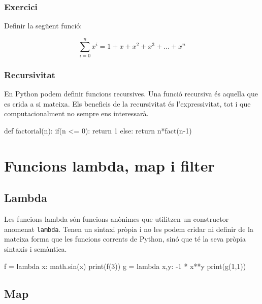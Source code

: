 \subsubsection*{Exercici } 


Definir la següent funció:

\[
\sum_{i=0}^{n}x^{i}=1+x+x^{2}+x^{3}+\ldots + x^{n}
\]



\subsubsection{Recursivitat}

En Python podem definir funcions recursives. Una funció recursiva és aquella que es crida a si mateixa. Els beneficis de la recursivitat és l'expressivitat, tot i que computacionalment no sempre ens interessarà.


\begin{tip}[caption=Càlcul recursiu d'un nombre factorial]
def factorial(n):
	if(n <= 0):
		return 1
	else:
		return n*fact(n-1)
\end{tip}


		
		
		

\section{Funcions lambda, map i filter}


\subsection{Lambda}

Les funcions lambda són funcions anònimes que utilitzen un constructor anomenat {\tt lambda}. Tenen un sintaxi pròpia i no les podem cridar ni definir de la mateixa forma que les funcions corrents de Python, sinó que té la seva pròpia sintaxis i semàntica.


\begin{tip}[caption=Funcions anònimes]
f = lambda x: math.sin(x)
print(f(3))
g = lambda x,y: -1 * x**y
print(g(1,1))
\end{tip}





\subsection{Map}


